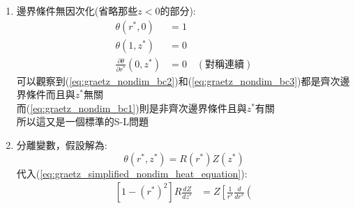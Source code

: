 \documentclass[../main.tex]{subfiles}
\begin{document}
\begin{itemize}
\begin{enumerate}
\begin{align}
          r^\ast \frac{\partial \theta}{\partial r^\ast}
        \right) + \frac{1}{\text{Pe}^2} \frac{\partial^2 \theta}{\partial z^{\ast 2}}
      \right]  \nonumber\\
      \div \frac{1}{\text{Pe}}\Rightarrow  \left[
        1 - (r^\ast)^2
      \right] \frac{\partial \theta}{\partial z^\ast} &= \left[
        \frac{1}{r^\ast} \frac{\partial}{\partial r^\ast} \left(
          r^\ast \frac{\partial \theta}{\partial r^\ast}
        \right) + \frac{1}{\text{Pe}^2} \frac{\partial^2 \theta}{\partial z^{\ast 2}}
      \right]   \label{eq:graetz_nondim_heat_equation}
    \end{align}
    由於$\text{Pe}=\text{Re}\cdot \text{Pr}$，所以假設流速很快，所以$\text{Re}\gg 1$\\
    而且液體的$\text{Pr}$通常在10左右，因此$\text{Pe}\gg 1$，可以忽略最後一項
    \begin{equation}
      \boxed{\left[
        1 - (r^\ast)^2
      \right] \frac{\partial \theta}{\partial z^\ast} = \left[
        \frac{1}{r^\ast} \frac{\partial}{\partial r^\ast} \left(
          r^\ast \frac{\partial \theta}{\partial r^\ast}
        \right)
      \right]}   \label{eq:graetz_simplified_nondim_heat_equation}
    \end{equation}
    \item 邊界條件無因次化(省略那些$z<0$的部分):
    \begin{align}
      \theta(r^\ast,0) &= 1 \label{eq:graetz_nondim_bc1}\\
      \theta(1,z^\ast) &= 0 \label{eq:graetz_nondim_bc2}\\
      \frac{\partial \theta}{\partial r^\ast}(0,z^\ast) &= 0 \quad (\text{對稱連續}) \label{eq:graetz_nondim_bc3}
    \end{align}
    可以觀察到(\ref{eq:graetz_nondim_bc2})和(\ref{eq:graetz_nondim_bc3})都是齊次邊界條件而且與$z^\ast$無關\\
    而(\ref{eq:graetz_nondim_bc1})則是非齊次邊界條件且與$z^\ast$有關\\
    所以這又是一個標準的S-L問題
    \item 分離變數，假設解為:
    \begin{equation}
      \theta(r^\ast, z^\ast) = R(r^\ast) Z(z^\ast)
    \end{equation}
    代入(\ref{eq:graetz_simplified_nondim_heat_equation}):
    \begin{align}
      \left[
        1 - (r^\ast)^2
      \right] R \frac{dZ}{d z^\ast} &= Z \left[
        \frac{1}{r^\ast} \frac{d}{d r^\ast} \left(

\end{align}
\end{enumerate}
\end{itemize}
\end{document}
